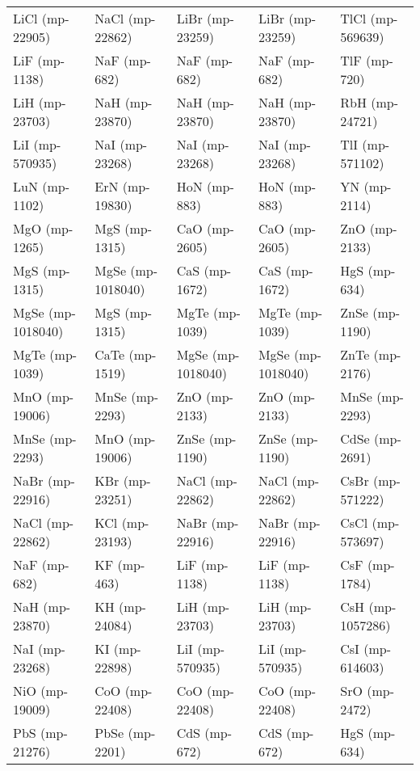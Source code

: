 \begin{longtable}{lllll}
  LiCl (mp-22905) &   NaCl (mp-22862) &     LiBr (mp-23259) &   LiBr (mp-23259) &    TlCl (mp-569639) \\
    LiF (mp-1138) &      NaF (mp-682) &        NaF (mp-682) &      NaF (mp-682) &        TlF (mp-720) \\
   LiH (mp-23703) &    NaH (mp-23870) &      NaH (mp-23870) &    NaH (mp-23870) &      RbH (mp-24721) \\
  LiI (mp-570935) &    NaI (mp-23268) &      NaI (mp-23268) &    NaI (mp-23268) &     TlI (mp-571102) \\
    LuN (mp-1102) &    ErN (mp-19830) &        HoN (mp-883) &      HoN (mp-883) &        YN (mp-2114) \\
    MgO (mp-1265) &     MgS (mp-1315) &       CaO (mp-2605) &     CaO (mp-2605) &       ZnO (mp-2133) \\
    MgS (mp-1315) & MgSe (mp-1018040) &       CaS (mp-1672) &     CaS (mp-1672) &        HgS (mp-634) \\
MgSe (mp-1018040) &     MgS (mp-1315) &      MgTe (mp-1039) &    MgTe (mp-1039) &      ZnSe (mp-1190) \\
   MgTe (mp-1039) &    CaTe (mp-1519) &   MgSe (mp-1018040) & MgSe (mp-1018040) &      ZnTe (mp-2176) \\
   MnO (mp-19006) &    MnSe (mp-2293) &       ZnO (mp-2133) &     ZnO (mp-2133) &      MnSe (mp-2293) \\
   MnSe (mp-2293) &    MnO (mp-19006) &      ZnSe (mp-1190) &    ZnSe (mp-1190) &      CdSe (mp-2691) \\
  NaBr (mp-22916) &    KBr (mp-23251) &     NaCl (mp-22862) &   NaCl (mp-22862) &    CsBr (mp-571222) \\
  NaCl (mp-22862) &    KCl (mp-23193) &     NaBr (mp-22916) &   NaBr (mp-22916) &    CsCl (mp-573697) \\
     NaF (mp-682) &       KF (mp-463) &       LiF (mp-1138) &     LiF (mp-1138) &       CsF (mp-1784) \\
   NaH (mp-23870) &     KH (mp-24084) &      LiH (mp-23703) &    LiH (mp-23703) &    CsH (mp-1057286) \\
   NaI (mp-23268) &     KI (mp-22898) &     LiI (mp-570935) &   LiI (mp-570935) &     CsI (mp-614603) \\
   NiO (mp-19009) &    CoO (mp-22408) &      CoO (mp-22408) &    CoO (mp-22408) &       SrO (mp-2472) \\
   PbS (mp-21276) &    PbSe (mp-2201) &        CdS (mp-672) &      CdS (mp-672) &        HgS (mp-634) \\

\end{longtable}
